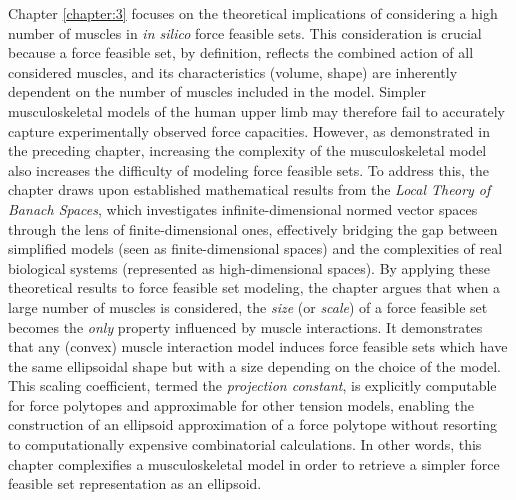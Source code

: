 Chapter \ref{chapter:3} focuses on the theoretical implications of considering a high number of muscles in \emph{in silico} force feasible sets. This consideration is crucial because a force feasible set, by definition, reflects the combined action of all considered muscles, and its characteristics (volume, shape) are inherently dependent on the number of muscles included in the model. Simpler musculoskeletal models of the human upper limb may therefore fail to accurately capture experimentally observed force capacities. However, as demonstrated in the preceding chapter, increasing the complexity of the musculoskeletal model also increases the difficulty of modeling force feasible sets. To address this, the chapter draws upon established mathematical results from the \emph{Local Theory of Banach Spaces}, which investigates infinite-dimensional normed vector spaces through the lens of finite-dimensional ones, effectively bridging the gap between simplified models (seen as finite-dimensional spaces) and the complexities of real biological systems (represented as high-dimensional spaces). By applying these theoretical results to force feasible set modeling, the chapter argues that when a large number of muscles is considered, the \emph{size} (or \emph{scale}) of a force feasible set becomes the \emph{only} property influenced by muscle interactions. It demonstrates that any (convex) muscle interaction model induces force feasible sets which have the same ellipsoidal shape but with a size depending on the choice of the model. This scaling coefficient, termed the \emph{projection constant}, is explicitly computable for force polytopes and approximable for other tension models, enabling the construction of an ellipsoid approximation of a force polytope without resorting to computationally expensive combinatorial calculations. In other words, this chapter complexifies a musculoskeletal model in order to retrieve a simpler force feasible set representation as an ellipsoid.

